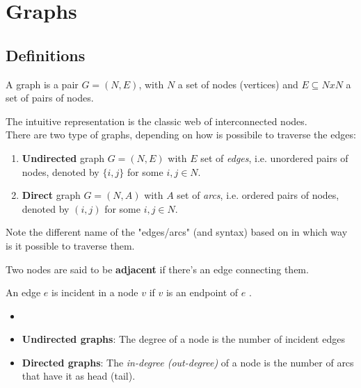 \chapter{Graphs}
    \section{Definitions}
        \begin{definition}[Graph]
            A graph is a pair $G = (N, E)$, with $N$ a set of nodes (vertices) and $E \subseteq N x N$ a set of pairs of nodes.
        \end{definition}
        The intuitive representation is the classic web of interconnected nodes.\\
        There are two type of graphs, depending on how is possibile to traverse the edges:
        \begin{enumerate}
            \item \textbf{Undirected} graph $G = (N, E)$ with $E$ set of \textit{edges}, i.e. unordered pairs of nodes, denoted by $\{i, j\}$ for some $i, j \in N$.
            \item \textbf{Direct} graph $G = (N, A)$ with $A$ set of \textit{arcs}, i.e. ordered pairs of nodes, denoted by $(i, j)$ for some $i, j \in N$.
        \end{enumerate}
        Note the different name of the "edges/arcs" (and syntax) based on in which way is it possible to traverse them.
        \begin{definition}
            Two nodes are said to be \textbf{adjacent} if there's an edge connecting them.
        \end{definition}
        \begin{definition}
            An edge $e$ is incident in a node $v$ if $v$ is an endpoint of $e$ .
        \end{definition}
        \begin{definition}
            \begin{itemize}
                \item[]
                \item[] \textbf{Undirected graphs}: The degree of a node is the number of incident edges
                \item[] \textbf{Directed graphs}: The \textit{in-degree (out-degree)} of a node is the number of arcs that have it as head (tail).
            \end{itemize}
        \end{definition}
